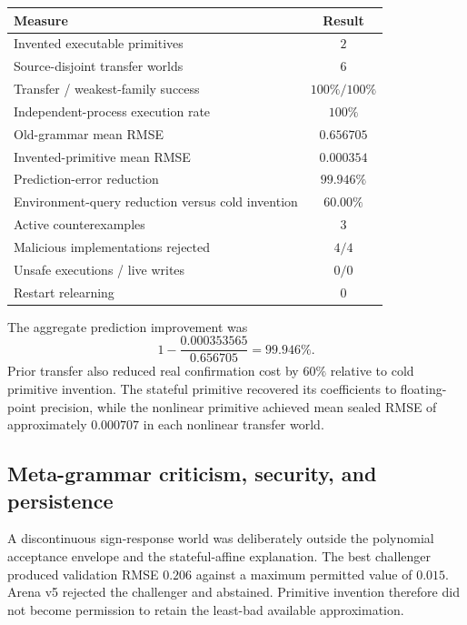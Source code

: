 \begin{center}
\small
\begin{tabular}{|>{\raggedright\arraybackslash}p{7.0cm}|c|}
\hline
\textbf{Measure} & \textbf{Result} \\
\hline
Invented executable primitives & $2$ \\
\hline
Source-disjoint transfer worlds & $6$ \\
\hline
Transfer / weakest-family success & $100\%/100\%$ \\
\hline
Independent-process execution rate & $100\%$ \\
\hline
Old-grammar mean RMSE & $0.656705$ \\
\hline
Invented-primitive mean RMSE & $0.000354$ \\
\hline
Prediction-error reduction & $99.946\%$ \\
\hline
Environment-query reduction versus cold invention & $60.00\%$ \\
\hline
Active counterexamples & $3$ \\
\hline
Malicious implementations rejected & $4/4$ \\
\hline
Unsafe executions / live writes & $0/0$ \\
\hline
Restart relearning & $0$ \\
\hline
\end{tabular}
\end{center}

The aggregate prediction improvement was
\begin{equation}
1-\frac{0.000353565}{0.656705}=99.946\%.
\label{eq:arena-v5-error-reduction}
\end{equation}
Prior transfer also reduced real confirmation cost by $60\%$ relative to cold
primitive invention.  The stateful primitive recovered its coefficients to
floating-point precision, while the nonlinear primitive achieved mean sealed
RMSE of approximately $0.000707$ in each nonlinear transfer world.


\subsection{Meta-grammar criticism, security, and persistence}
\label{subsec:arena-v5-criticism}

A discontinuous sign-response world was deliberately outside the polynomial
acceptance envelope and the stateful-affine explanation.  The best challenger
produced validation RMSE $0.206$ against a maximum permitted value of $0.015$.
Arena v5 rejected the challenger and abstained.  Primitive invention therefore
did not become permission to retain the least-bad available approximation.

